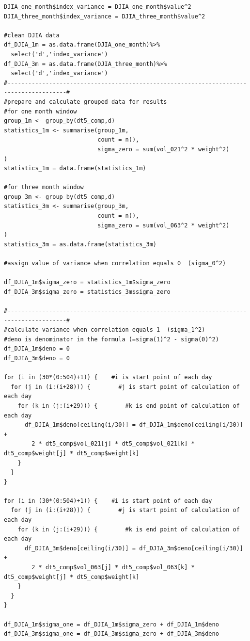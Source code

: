 \documentclass[10pt]{article}
\begin{document}
\begin{lstlisting}
DJIA_one_month$index_variance = DJIA_one_month$value^2
DJIA_three_month$index_variance = DJIA_three_month$value^2

#clean DJIA data
df_DJIA_1m = as.data.frame(DJIA_one_month)%>%
  select('d','index_variance')
df_DJIA_3m = as.data.frame(DJIA_three_month)%>%
  select('d','index_variance')
#---------------------------------------------------------------------------------------#
#prepare and calculate grouped data for results
#for one month window
group_1m <- group_by(dt5_comp,d)
statistics_1m <- summarise(group_1m,
                           count = n(),
                           sigma_zero = sum(vol_021^2 * weight^2)
) 
statistics_1m = data.frame(statistics_1m)

#for three month window
group_3m <- group_by(dt5_comp,d)
statistics_3m <- summarise(group_3m,
                           count = n(),
                           sigma_zero = sum(vol_063^2 * weight^2)
) 
statistics_3m = as.data.frame(statistics_3m)

#assign value of variance when correlation equals 0  (sigma_0^2)

df_DJIA_1m$sigma_zero = statistics_1m$sigma_zero
df_DJIA_3m$sigma_zero = statistics_3m$sigma_zero

#---------------------------------------------------------------------------------------#
#calculate variance when correlation equals 1  (sigma_1^2)
#deno is denominator in the formula (=sigma(1)^2 - sigma(0)^2)
df_DJIA_1m$deno = 0
df_DJIA_3m$deno = 0

for (i in (30*(0:504)+1)) {    #i is start point of each day
  for (j in (i:(i+28))) {        #j is start point of calculation of each day
    for (k in (j:(i+29))) {        #k is end point of calculation of each day
      df_DJIA_1m$deno[ceiling(i/30)] = df_DJIA_1m$deno[ceiling(i/30)] +
        2 * dt5_comp$vol_021[j] * dt5_comp$vol_021[k] * dt5_comp$weight[j] * dt5_comp$weight[k]
    }
  }
}

for (i in (30*(0:504)+1)) {    #i is start point of each day
  for (j in (i:(i+28))) {        #j is start point of calculation of each day
    for (k in (j:(i+29))) {        #k is end point of calculation of each day
      df_DJIA_3m$deno[ceiling(i/30)] = df_DJIA_3m$deno[ceiling(i/30)] +
        2 * dt5_comp$vol_063[j] * dt5_comp$vol_063[k] * dt5_comp$weight[j] * dt5_comp$weight[k]
    }
  }
}

df_DJIA_1m$sigma_one = df_DJIA_1m$sigma_zero + df_DJIA_1m$deno
df_DJIA_3m$sigma_one = df_DJIA_3m$sigma_zero + df_DJIA_3m$deno


\end{lstlisting}
\end{document}
